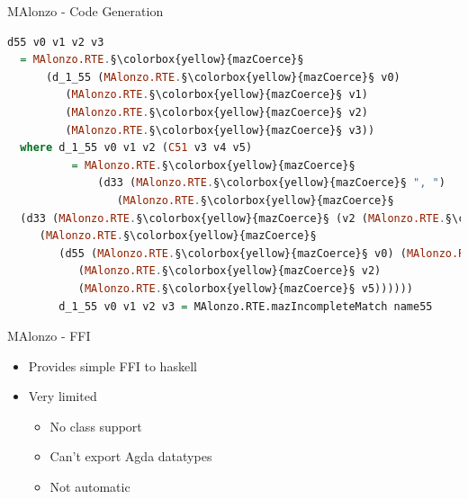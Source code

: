 \begin{frame}[fragile]{MAlonzo - Code Generation}
\begin{lstlisting}[language=Haskell,basicstyle=\scriptsize]
d55 v0 v1 v2 v3
  = MAlonzo.RTE.§\colorbox{yellow}{mazCoerce}§
      (d_1_55 (MAlonzo.RTE.§\colorbox{yellow}{mazCoerce}§ v0)
         (MAlonzo.RTE.§\colorbox{yellow}{mazCoerce}§ v1)
         (MAlonzo.RTE.§\colorbox{yellow}{mazCoerce}§ v2)
         (MAlonzo.RTE.§\colorbox{yellow}{mazCoerce}§ v3))
  where d_1_55 v0 v1 v2 (C51 v3 v4 v5)
          = MAlonzo.RTE.§\colorbox{yellow}{mazCoerce}§
              (d33 (MAlonzo.RTE.§\colorbox{yellow}{mazCoerce}§ ", ")
                 (MAlonzo.RTE.§\colorbox{yellow}{mazCoerce}§
  (d33 (MAlonzo.RTE.§\colorbox{yellow}{mazCoerce}§ (v2 (MAlonzo.RTE.§\colorbox{yellow}{mazCoerce}§ v4)))
     (MAlonzo.RTE.§\colorbox{yellow}{mazCoerce}§
        (d55 (MAlonzo.RTE.§\colorbox{yellow}{mazCoerce}§ v0) (MAlonzo.RTE.§\colorbox{yellow}{mazCoerce}§ v3)
           (MAlonzo.RTE.§\colorbox{yellow}{mazCoerce}§ v2)
           (MAlonzo.RTE.§\colorbox{yellow}{mazCoerce}§ v5))))))
        d_1_55 v0 v1 v2 v3 = MAlonzo.RTE.mazIncompleteMatch name55
\end{lstlisting}
\end{frame}

\begin{frame}{MAlonzo - FFI}
\begin{itemize}
\item Provides simple FFI to haskell
\item Very limited
  \begin{itemize}
    \item No class support
    \item Can't export Agda datatypes
    \item Not automatic
  \end{itemize}
\end{itemize}
\end{frame}

